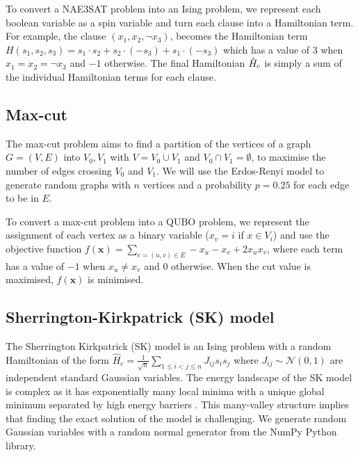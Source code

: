 To convert a NAE3SAT problem into an Ising problem, we represent each boolean variable as a spin variable and turn each clause into a Hamiltonian term. For example, the clause $(x_1, x_2, \neg x_3)$, becomes the Hamiltonian term $H(s_1, s_2, s_3) = s_1 \cdot s_2 + s_2 \cdot (-s_3) + s_1 \cdot (-s_3)$ which has a value of $3$ when $x_1=x_2=\neg x_3$ and $-1$ otherwise. The final Hamiltonian $\Hat{H}_c$ is simply a sum of the individual Hamiltonian terms for each clause.

\subsection*{Max-cut}
The max-cut problem aims to find a partition of the vertices of a graph $G = (V, E)$ into $V_0, V_1$ with $V = V_0 \cup V_1$ and $V_0 \cap V_1 = \emptyset$, to maximise the number of edges crossing $V_0$ and $V_1$. We will use the Erdos-Renyi model to generate random graphs with $n$ vertices and a probability $p=0.25$ for each edge to be in $E$.

To convert a max-cut problem into a QUBO problem, we represent the assignment of each vertex as a binary variable ($x_v = i$ if $x \in V_i$) and use the objective function $f(\mathbf{x}) = \sum_{e = (u, v) \in E} -x_u - x_v + 2x_u x_v$, where each term has a value of $-1$ when $x_u  \neq x_v$ and $0$ otherwise. When the cut value is maximised, $f(\mathbf{x})$ is minimised. 

\subsection*{Sherrington-Kirkpatrick (SK) model}
The Sherrington Kirkpatrick (SK) model is an Ising problem with a random Hamiltonian of the form $\hat{H}_c = \frac{1}{\sqrt{n}} \sum_{1 \leq i < j \leq n} J_{ij}s_i s_j$
where $J_{ij} \sim \mathcal{N}(0,1)$ are independent standard Gaussian variables. The energy landscape of the SK model is complex as it has exponentially many local minima with a unique global minimum separated by high energy barriers \cite{skmodel}. This many-valley structure implies that finding the exact solution of the model is challenging. We generate random Gaussian variables with a random normal generator from the NumPy Python library.


